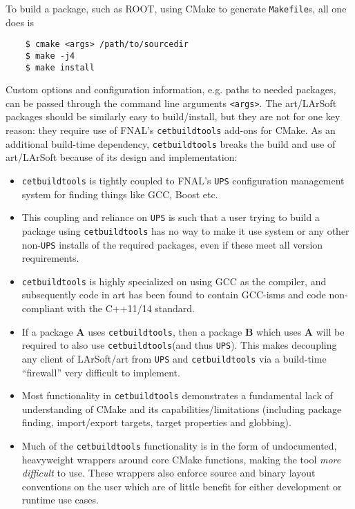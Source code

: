 \documentclass[usletter]{article}
\newcommand{\code}[1]{\texttt{#1}}
\newcommand{\ups}{\code{UPS}\xspace}
\newcommand{\cetbuildtools}{\code{cetbuildtools}\xspace}
\newcommand{\art}{art\xspace}
\newcommand{\larsoft}{LArSoft\xspace}
\begin{document}
To build a package, such as ROOT, using CMake to generate \texttt{Makefile}s, all one
does is
\begin{verbatim}
    $ cmake <args> /path/to/sourcedir
    $ make -j4
    $ make install
 \end{verbatim}

Custom options and configuration information, e.g. paths to needed packages,
can be passed through the command line arguments \verb|<args>|. The \art/\larsoft
packages should be similarly easy to build/install, but they are not for one
key reason: they require use of FNAL's \cetbuildtools add-ons for CMake.
As an additional build-time dependency, \cetbuildtools breaks the build
and use of \art/\larsoft because of its design and implementation:
\begin{itemize}

	\item \cetbuildtools is tightly coupled to FNAL's \ups configuration
  management system for finding things like GCC, Boost etc.
  
	\item This coupling and reliance on \ups is such that a user trying to build a
  package using \cetbuildtools has no way to
  make it use system or any other non-\ups installs of the required packages,
  even if these meet all version requirements.
  
	\item \cetbuildtools is highly specialized on using GCC as the compiler, and
  subsequently code in \art has been found to contain GCC-isms and code
  non-compliant with the C++11/14 standard.
  
	\item If a package \textbf{A} uses \cetbuildtools, then a package \textbf{B} which uses \textbf{A}
  will be required to also use \cetbuildtools (and thus \ups). This makes
  decoupling any client of \larsoft/\art from \ups and \cetbuildtools via
  a build-time ``firewall'' very difficult to implement.
  
	\item Most functionality in \cetbuildtools demonstrates a fundamental
  lack of understanding of CMake and its capabilities/limitations (including
  package finding, import/export targets, target properties and globbing).
  
	\item Much of the \cetbuildtools functionality is in the form of undocumented,
  heavyweight wrappers around core CMake functions, making the tool \textit{more
  difficult} to use. These wrappers also enforce source and binary layout
  conventions on the user which are of little benefit for either development
  or runtime use cases.
\end{itemize}
\end{document}

